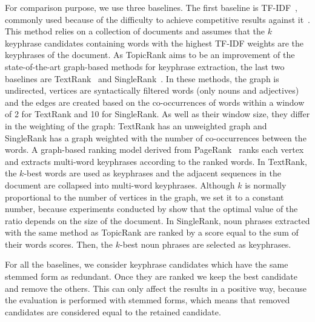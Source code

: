     For comparison purpose, we use three baselines. The first baseline is
    TF-IDF~\cite{jones1972tfidf}, commonly used because of the difficulty to achieve competitive
    results against it~\cite{hassan2010conundrums}. This method relies on a
    collection of documents and assumes that the $k$ keyphrase candidates
    containing words with the highest TF-IDF weights are the keyphrases of the
    document. As TopicRank aims to be an improvement of the state-of-the-art
    graph-based methods for keyphrase extraction, the last two baselines are
    TextRank~\cite{mihalcea2004textrank} and
    SingleRank~\cite{wan2008expandrank}. In these methods, the graph is
    undirected, vertices are syntactically filtered words (only nouns and
    adjectives) and the edges are created based on the co-occurrences of words
    within a window of 2 for TextRank and 10 for SingleRank. As well as their
    window size, they differ in the weighting of the graph: TextRank has an
    unweighted graph and SingleRank has a graph weighted with the number of
    co-occurrences between the words. A graph-based ranking model derived from
    PageRank~\cite{brin1998pagerank} ranks each vertex and extracts multi-word
    keyphrases according to the ranked words. In TextRank, the $k$-best words
    are used as keyphrases and the adjacent sequences in the document are
    collapsed into multi-word keyphrases. Although $k$ is normally proportional
    to the number of vertices in the graph, we set it to a constant number,
    because experiments conducted by  show that
    the optimal value of the ratio depends on the size of the document. In
    SingleRank, noun phrases extracted with the same method as TopicRank are
    ranked by a score equal to the sum of their words scores. Then, the
    $k$-best noun phrases are selected as keyphrases.
    
    For all the baselines, we consider keyphrase candidates which have the same
    stemmed form as redundant. Once they are ranked we keep the best candidate
    and remove the others. This can only affect the results in a positive way,
    because the evaluation is performed with stemmed forms, which means that
    removed candidates are considered equal to the retained candidate.

